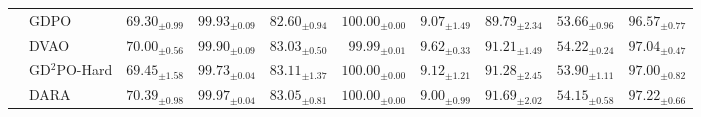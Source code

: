 \begin{table}[t]
\begin{tabular}{llrrrrrrrr}
 & GDPO & $69.30_{\pm 0.99}$ & $99.93_{\pm 0.09}$ & $82.60_{\pm 0.94}$ & $\mathbf{100.00}_{\pm 0.00}$ & $9.07_{\pm 1.49}$ & $89.79_{\pm 2.34}$ & $53.66_{\pm 0.96}$ & $96.57_{\pm 0.77}$ \\
 & DVAO & $70.00_{\pm 0.56}$ & $99.90_{\pm 0.09}$ & $83.03_{\pm 0.50}$ & $99.99_{\pm 0.01}$ & $\mathbf{9.62}_{\pm 0.33}$ & $91.21_{\pm 1.49}$ & $\mathbf{54.22}_{\pm 0.24}$ & $97.04_{\pm 0.47}$ \\
 & GD$^2$PO-Hard & $69.45_{\pm 1.58}$ & $99.73_{\pm 0.04}$ & $\mathbf{83.11}_{\pm 1.37}$ & $\mathbf{100.00}_{\pm 0.00}$ & $9.12_{\pm 1.21}$ & $91.28_{\pm 2.45}$ & $53.90_{\pm 1.11}$ & $97.00_{\pm 0.82}$ \\
 & DARA & $\mathbf{70.39}_{\pm 0.98}$ & $\mathbf{99.97}_{\pm 0.04}$ & $83.05_{\pm 0.81}$ & $\mathbf{100.00}_{\pm 0.00}$ & $9.00_{\pm 0.99}$ & $\mathbf{91.69}_{\pm 2.02}$ & $54.15_{\pm 0.58}$ & $\mathbf{97.22}_{\pm 0.66}$ \\
\bottomrule
\end{tabular}
\end{table}
